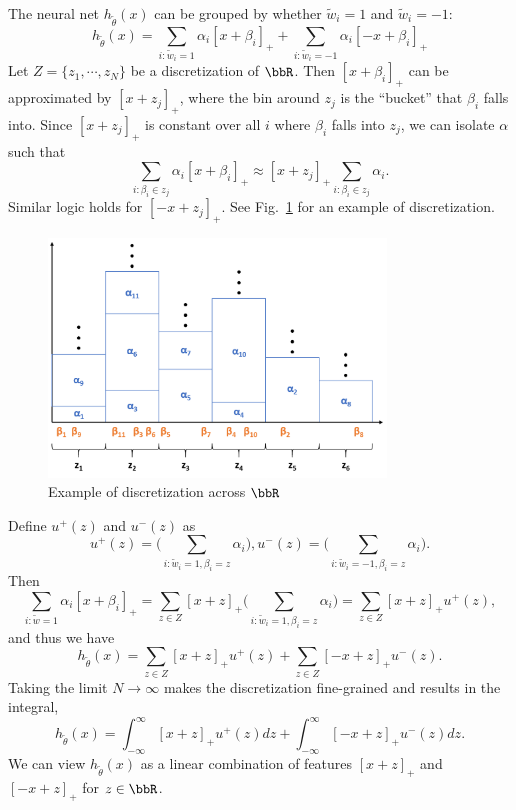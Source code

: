 The neural net $h_{\widetilde \theta}(x)$ can be grouped by whether $\widetilde w_i = 1$ and $\widetilde w_i = -1$:
\[
h_{\widetilde\theta}(x) = \sum_{i: \widetilde w_i = 1} \alpha_i [x+\beta_i]_+ + \sum_{i: \widetilde w_i = -1} \alpha_i [-x+\beta_i]_+
\]
Let $Z=\{z_1, \cdots, z_N\}$ be a discretization of $\bbR$. Then $[x+\beta_i]_+$ can be approximated by $[x+z_j]_+$, where the bin around $z_j$ is the ``bucket'' that $\beta_i$ falls into. Since $[x+z_j]_+$ is constant over all $i$ where $\beta_i$ falls into $z_j$, we can isolate $\alpha$ such that
\[
\sum_{i: \beta_i \in z_j} \alpha_i [x+\beta_i]_+ \approx [x+z_j]_+ \sum_{i: \beta_i \in z_j} \alpha_i.
\]
Similar logic holds for $[-x+z_j]_+$. See Fig.~\ref{fig:disc} for an example of discretization. 
\begin{figure}[h]
\centering
\includegraphics[width=0.8\textwidth]{figure/Lecture06/discretization.png}
\caption{Example of discretization across $\bbR$} \label{fig:disc}
\end{figure}

Define $u^+(z)$ and $u^-(z)$ as
\[u^+(z)=\bigg(\sum_{i:\widetilde w_i = 1, \beta_i = z} \alpha_i\bigg), u^-(z)=\bigg(\sum_{i:\widetilde w_i = -1, \beta_i = z} \alpha_i\bigg).
\]
Then
\[
\sum_{i: \widetilde w = 1} \alpha_i [x+\beta_i]_+ = \sum_{z \in Z} [x+z]_+ \bigg(\sum_{i:\widetilde w_i = 1, \beta_i = z} \alpha_i\bigg) = \sum_{z \in Z} [x+z]_+ u^+(z),
\]
and thus we have 
\[
h_{\widetilde\theta}(x) = \sum_{z \in Z} [x+z]_+ u^+(z) + \sum_{z \in Z} [-x+z]_+ u^-(z).
\]
Taking the limit $N\to\infty$ makes the discretization fine-grained and results in the integral,
\[
h_{\widetilde\theta}(x) = \int_{-\infty}^\infty [x+z]_+ u^+(z) dz + \int_{-\infty}^\infty [-x+z]_+ u^-(z) dz.
\]
We can view $h_{\widetilde\theta}(x)$ as a linear combination of features $[x+z]_+$ and $[-x+z]_+$ for $z \in \bbR$.

